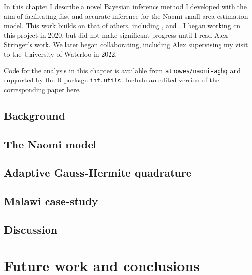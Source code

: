 \documentclass[a4paper, nobind]{templates/ociamthesis}
\begin{document}
\adjustmtc
{}

In this chapter I describe a novel Bayesian inference method I developed with the aim of facilitating fast and accurate inference for the Naomi small-area estimation model.
This work builds on that of others, including \textcite{rue2009approximate}, \textcite{kristensen2016tmb} and \textcite{stringer2021fast}.
I began working on this project in 2020, but did not make significant progress until I read Alex Stringer's work.
We later began collaborating, including Alex supervising my visit to the University of Waterloo in 2022.

Code for the analysis in this chapter is available from \href{https://github.com/athowes/elgm-inf}{\texttt{athowes/naomi-aghq}} and supported by the R package \href{https://athowes.github.io/inf.utils}{\texttt{inf.utils}}.
Include an edited version of the corresponding paper here.

\hypertarget{background-3}{%
\section{Background}\label{background-3}}

\hypertarget{the-naomi-model}{%
\section{The Naomi model}\label{the-naomi-model}}

\hypertarget{adaptive-gauss-hermite-quadrature}{%
\section{Adaptive Gauss-Hermite quadrature}\label{adaptive-gauss-hermite-quadrature}}

\hypertarget{malawi-case-study}{%
\section{Malawi case-study}\label{malawi-case-study}}

\hypertarget{discussion-2}{%
\section{Discussion}\label{discussion-2}}

\hypertarget{conclusions}{%
\chapter{Future work and conclusions}\label{conclusions}}
\end{document}
